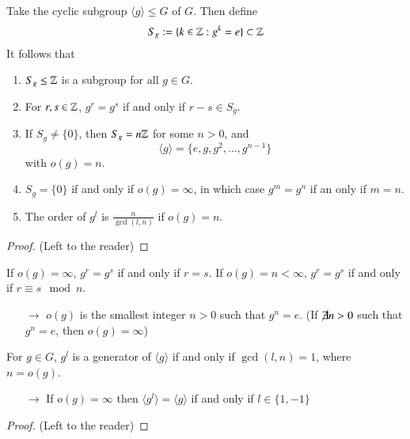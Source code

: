 \begin{proposition}
    Take the cyclic subgroup $\langle g \rangle \leq G$ of $G$. Then define \begin{equation}
        S_g := \{k \in \mathbb Z: g^k = e\}\subset \mathbb Z
    \end{equation}
    It follows that \begin{enumerate}
        \item $S_g \leq \mathbb Z$ is a subgroup for all $g \in G$.
        \item For $r,s \in \mathbb Z$, $g^r = g^s$ if and only if $r-s \in S_g$.
        \item If $S_g \neq \{0\}$, then $S_g = n\mathbb Z$ for some $n >0$, and \begin{equation}
            \langle g \rangle = \{e,g,g^2,...,g^{n-1}\}
        \end{equation}
        with $o(g) =n$.
        \item $S_g = \{0\}$ if and only if $o(g) = \infty$, in which case $g^m = g^n$ if an only if $m = n$.
        \item The order of $g^l$ is $\frac{n}{\gcd(l,n)}$ if $o(g) = n$.
    \end{enumerate}
\end{proposition}
\begin{proof}
    (Left to the reader)
\end{proof}

\begin{remark}
    If $o(g) = \infty$, $g^r = g^s$ if and only if $r = s$. If $o(g) = n < \infty$, $g^r = g^s$ if and only if $r \equiv s \mod n$.
    \begin{enumerate}
        \item[$\rightarrow$] $o(g)$ is the smallest integer $n > 0$ such that $g^n = e$. (If $\cancel{\exists}n > 0$ such that $g^n = e$, then $o(g) = \infty$) 
    \end{enumerate}
\end{remark}

\begin{corollary}
    For $g \in G$, $g^l$ is a generator of $\langle g \rangle$ if and only if $\gcd(l,n) = 1$, where $n = o(g)$.
\end{corollary}
\begin{enumerate}
    \item[$\rightarrow$] If $o(g) = \infty$ then $\langle g^l \rangle = \langle g \rangle$ if and only if $l \in \{1,-1\}$
\end{enumerate}
\begin{proof}
    (Left to the reader)
\end{proof}

